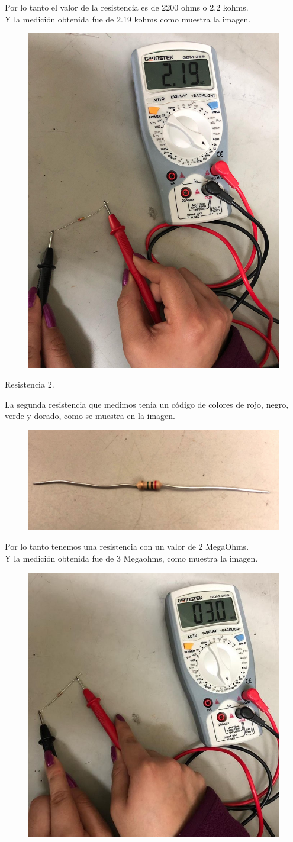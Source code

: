 \documentclass[11pt,a4paper]{report}
\begin{document}
\begin{flushleft}
	Por lo tanto el valor de la resistencia es de 2200 ohms o 2.2 kohms.\\
	Y la medici\'on obtenida fue de 2.19 kohms como muestra la imagen.
	\begin{figure}[H]
		\centering
		\includegraphics[width=0.3\linewidth]{medicion1}
		\label{fig:medicion1}
	\end{figure}
	\clearpage
	
	\begin{large}
		\vspace*{2cm}
		Resistencia 2.\\
	\end{large}
	La segunda resistencia que medimos tenia un c\'odigo de colores de rojo, negro, verde y dorado, como se muestra en la imagen.\\
	
	\begin{figure}[H]
		\centering
		\includegraphics[width=0.4\linewidth]{resistencia2}
		\label{fig:resistencia2}
	\end{figure}
	Por lo tanto tenemos una resistencia con un valor de 2 MegaOhms.\\
	Y la medici\'on obtenida fue de 3 Megaohms, como muestra la imagen.\\
	\begin{figure}[H]
		\centering
		\includegraphics[width=0.3\linewidth]{medicion2}
		\label{fig:medicion2}
	\end{figure}
	

\end{flushleft}
\end{document}
